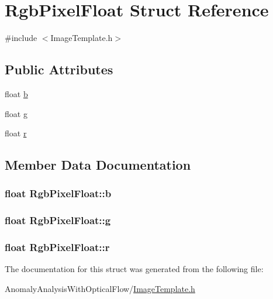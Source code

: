 \hypertarget{struct_rgb_pixel_float}{\section{Rgb\+Pixel\+Float Struct Reference}
\label{struct_rgb_pixel_float}
}


{\ttfamily \#include $<$Image\+Template.\+h$>$}

\subsection*{Public Attributes}
\begin{DoxyCompactItemize}
\item 
float \hyperlink{struct_rgb_pixel_float_a7b2a4f7abd35c6a3aaeea21155cc2b53}{b}
\item 
float \hyperlink{struct_rgb_pixel_float_a6b4342cf1118ec4a8c5cb6fc5c44134e}{g}
\item 
float \hyperlink{struct_rgb_pixel_float_a23d00c79817fa348ef790fe704d80621}{r}
\end{DoxyCompactItemize}


\subsection{Member Data Documentation}
\hypertarget{struct_rgb_pixel_float_a7b2a4f7abd35c6a3aaeea21155cc2b53}{
\subsubsection[{b}]{\setlength{\rightskip}{0pt plus 5cm}float Rgb\+Pixel\+Float\+::b}}\label{struct_rgb_pixel_float_a7b2a4f7abd35c6a3aaeea21155cc2b53}
\hypertarget{struct_rgb_pixel_float_a6b4342cf1118ec4a8c5cb6fc5c44134e}{
\subsubsection[{g}]{\setlength{\rightskip}{0pt plus 5cm}float Rgb\+Pixel\+Float\+::g}}\label{struct_rgb_pixel_float_a6b4342cf1118ec4a8c5cb6fc5c44134e}
\hypertarget{struct_rgb_pixel_float_a23d00c79817fa348ef790fe704d80621}{
\subsubsection[{r}]{\setlength{\rightskip}{0pt plus 5cm}float Rgb\+Pixel\+Float\+::r}}\label{struct_rgb_pixel_float_a23d00c79817fa348ef790fe704d80621}


The documentation for this struct was generated from the following file\+:\begin{DoxyCompactItemize}
\item 
Anomaly\+Analysis\+With\+Optical\+Flow/\hyperlink{_image_template_8h}{Image\+Template.\+h}\end{DoxyCompactItemize}
